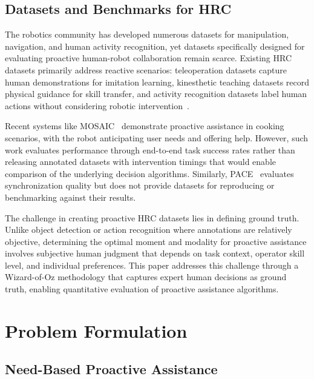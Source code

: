\documentclass[sensors,article,submit,pdftex,moreauthors]{Definitions/mdpi}
\begin{document}
\subsection{Datasets and Benchmarks for HRC}

The robotics community has developed numerous datasets for manipulation, navigation, and human activity recognition, yet datasets specifically designed for evaluating proactive human-robot collaboration remain scarce. Existing HRC datasets primarily address reactive scenarios: teleoperation datasets capture human demonstrations for imitation learning, kinesthetic teaching datasets record physical guidance for skill transfer, and activity recognition datasets label human actions without considering robotic intervention~\cite{Mandlekar2021}.

Recent systems like MOSAIC~\cite{Wang2024} demonstrate proactive assistance in cooking scenarios, with the robot anticipating user needs and offering help. However, such work evaluates performance through end-to-end task success rates rather than releasing annotated datasets with intervention timings that would enable comparison of the underlying decision algorithms. Similarly, PACE~\cite{Umbrico2022} evaluates synchronization quality but does not provide datasets for reproducing or benchmarking against their results.

The challenge in creating proactive HRC datasets lies in defining ground truth. Unlike object detection or action recognition where annotations are relatively objective, determining the optimal moment and modality for proactive assistance involves subjective human judgment that depends on task context, operator skill level, and individual preferences. This paper addresses this challenge through a Wizard-of-Oz methodology that captures expert human decisions as ground truth, enabling quantitative evaluation of proactive assistance algorithms.

\section{Problem Formulation}

\subsection{Need-Based Proactive Assistance}
\end{document}
